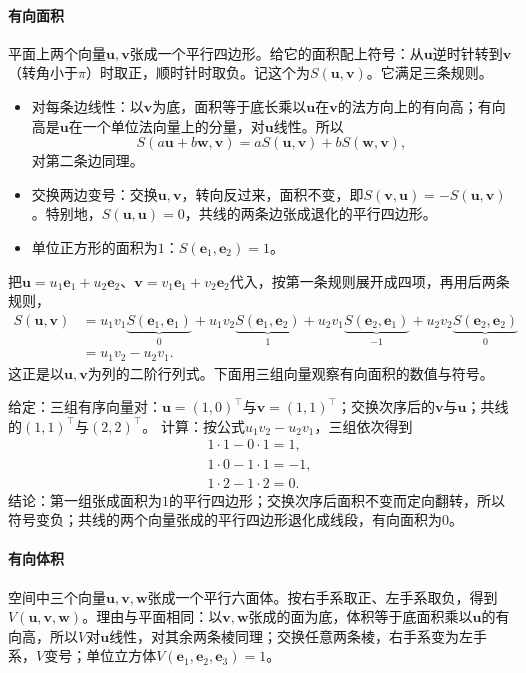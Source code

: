 \paragraph{有向面积}
平面上两个向量$\bm u,\bm v$张成一个平行四边形。给它的面积配上符号：从$\bm u$逆时针转到$\bm v$（转角小于$\pi$）时取正，顺时针时取负。记这个为$S(\bm u,\bm v)$。它满足三条规则。
\begin{itemize}
 \item 对每条边线性：以$\bm v$为底，面积等于底长乘以$\bm u$在$\bm v$的法方向上的有向高；有向高是$\bm u$在一个单位法向量上的分量，对$\bm u$线性。所以
 \[
  S(a\bm u+b\bm w,\bm v)=aS(\bm u,\bm v)+bS(\bm w,\bm v),
 \]
 对第二条边同理。
 \item 交换两边变号：交换$\bm u,\bm v$，转向反过来，面积不变，即$S(\bm v,\bm u)=-S(\bm u,\bm v)$。特别地，$S(\bm u,\bm u)=0$，共线的两条边张成退化的平行四边形。
 \item 单位正方形的面积为$1$：$S(\bm e_1,\bm e_2)=1$。
\end{itemize}
把$\bm u=u_1\bm e_1+u_2\bm e_2$、$\bm v=v_1\bm e_1+v_2\bm e_2$代入，按第一条规则展开成四项，再用后两条规则，
\[
 \begin{aligned}
 S(\bm u,\bm v)
 &=u_1v_1\underbrace{S(\bm e_1,\bm e_1)}_{0}+u_1v_2\underbrace{S(\bm e_1,\bm e_2)}_{1}
 +u_2v_1\underbrace{S(\bm e_2,\bm e_1)}_{-1}+u_2v_2\underbrace{S(\bm e_2,\bm e_2)}_{0}\\
 &=u_1v_2-u_2v_1.
 \end{aligned}
\]
这正是以$\bm u,\bm v$为列的二阶行列式。下面用三组向量观察有向面积的数值与符号。
\begin{example}[平面上的有向面积]
\label{ex:ls-oriented-area}
给定：三组有序向量对：$\bm u=(1,0)^\top$与$\bm v=(1,1)^\top$；交换次序后的$\bm v$与$\bm u$；共线的$(1,1)^\top$与$(2,2)^\top$。
计算：按公式$u_1v_2-u_2v_1$，三组依次得到
\[
 \begin{gathered}
1\cdot1-0\cdot1=1,\\
1\cdot0-1\cdot1=-1,\\
1\cdot2-1\cdot2=0.
 \end{gathered}
\]
结论：第一组张成面积为$1$的平行四边形；交换次序后面积不变而定向翻转，所以符号变负；共线的两个向量张成的平行四边形退化成线段，有向面积为$0$。
\end{example}

\paragraph{有向体积}
空间中三个向量$\bm u,\bm v,\bm w$张成一个平行六面体。按右手系取正、左手系取负，得到$V(\bm u,\bm v,\bm w)$。理由与平面相同：以$\bm v,\bm w$张成的面为底，体积等于底面积乘以$\bm u$的有向高，所以$V$对$\bm u$线性，对其余两条棱同理；交换任意两条棱，右手系变为左手系，$V$变号；单位立方体$V(\bm e_1,\bm e_2,\bm e_3)=1$。

